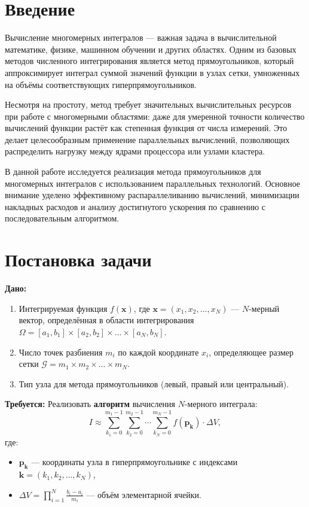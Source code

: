 \documentclass[12pt,a4paper]{extarticle}
\begin{document}
\newpage

\tableofcontents
\newpage

\section{Введение}
Вычисление многомерных интегралов — важная задача в вычислительной математике, физике, машинном обучении и других областях. Одним из базовых методов численного интегрирования является метод прямоугольников, который аппроксимирует интеграл суммой значений функции в узлах сетки, умноженных на объёмы соответствующих гиперпрямоугольников.

Несмотря на простоту, метод требует значительных вычислительных ресурсов при работе с многомерными областями: даже для умеренной точности количество вычислений функции растёт как степенная функция от числа измерений. Это делает целесообразным применение параллельных вычислений, позволяющих распределить нагрузку между ядрами процессора или узлами кластера.

В данной работе исследуется реализация метода прямоугольников для многомерных интегралов с использованием параллельных технологий. Основное внимание уделено эффективному распараллеливанию вычислений, минимизации накладных расходов и анализу достигнутого ускорения по сравнению с последовательным алгоритмом.

\newpage
\section{Постановка задачи}

\noindent \textbf{Дано:}
\begin{enumerate}
    \item Интегрируемая функция \( f(\mathbf{x}) \), где \( \mathbf{x} = (x_1, x_2, \ldots, x_N) \) — \( N \)-мерный вектор, определённая в области интегрирования \( \Omega = [a_1, b_1] \times [a_2, b_2] \times \ldots \times [a_N, b_N] \).
    
    \item Число точек разбиения \( m_i \) по каждой координате \( x_i \), определяющее размер сетки \( \mathcal{G} = m_1 \times m_2 \times \ldots \times m_N \).
    
    \item Тип узла для метода прямоугольников (левый, правый или центральный).
\end{enumerate}

\noindent \textbf{Требуется:}\newline
Реализовать \textbf{алгоритм} вычисления \( N \)-мерного интеграла:
    \[
    I \approx \sum_{k_1=0}^{m_1-1} \sum_{k_2=0}^{m_2-1} \cdots \sum_{k_N=0}^{m_N-1} f(\mathbf{p}_{\mathbf{k}}) \cdot \Delta V,
    \]
    где:
    \begin{itemize}
        \item \( \mathbf{p}_{\mathbf{k}} \) — координаты узла в гиперпрямоугольнике с индексами \( \mathbf{k} = (k_1, k_2, \ldots, k_N) \),
        \item \( \Delta V = \prod_{i=1}^N \frac{b_i - a_i}{m_i} \) — объём элементарной ячейки.
    \end{itemize}
\end{document}
